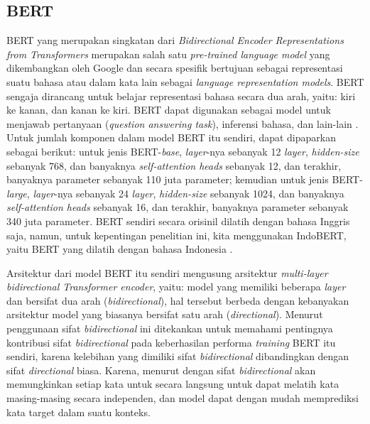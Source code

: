 \subsection{BERT}
\label{2.5.1}

BERT yang merupakan singkatan dari \emph{Bidirectional Encoder Representations from Transformers} merupakan salah satu \emph{pre-trained language model} yang dikembangkan oleh Google dan secara spesifik bertujuan sebagai representasi suatu bahasa atau dalam kata lain sebagai \emph{language representation models}. BERT sengaja dirancang untuk belajar representasi bahasa secara dua arah, yaitu: kiri ke kanan, dan kanan ke kiri. BERT dapat digunakan sebagai model untuk menjawab pertanyaan (\emph{question answering task}), inferensi bahasa, dan lain-lain \citep{devlin-etal-2019-bert}. Untuk jumlah komponen dalam model BERT itu sendiri, dapat dipaparkan sebagai berikut: untuk jenis BERT-\emph{base}, \emph{layer}-nya sebanyak 12 \emph{layer}, \emph{hidden-size} sebanyak 768, dan banyaknya \emph{self-attention heads} sebanyak 12, dan terakhir, banyaknya parameter sebanyak 110 juta parameter; kemudian untuk jenis BERT-\emph{large}, \emph{layer}-nya sebanyak 24 \emph{layer}, \emph{hidden-size} sebanyak 1024, dan banyaknya \emph{self-attention heads} sebanyak 16, dan terakhir, banyaknya parameter sebanyak 340 juta parameter. BERT sendiri secara orisinil dilatih dengan bahasa Inggris saja, namun, untuk kepentingan penelitian ini, kita menggunakan IndoBERT, yaitu BERT yang dilatih dengan bahasa Indonesia \citep{koto2020indolem}.

Arsitektur dari model BERT itu sendiri mengusung arsitektur \emph{multi-layer bidirectional Transformer encoder}, yaitu: model yang memiliki beberapa \emph{layer} dan bersifat dua arah (\emph{bidirectional}), hal tersebut berbeda dengan kebanyakan arsitektur model yang biasanya bersifat satu arah (\emph{directional}). Menurut 
\citet{devlin-etal-2019-bert} penggunaan sifat \emph{bidirectional} ini ditekankan untuk memahami pentingnya kontribusi sifat \emph{bidirectional} pada keberhasilan performa \emph{training} BERT itu sendiri, karena kelebihan yang dimiliki sifat \emph{bidirectional} dibandingkan dengan sifat \emph{directional} biasa. Karena, menurut \citet{devlin-etal-2019-bert} dengan sifat \emph{bidirectional} akan memungkinkan setiap kata untuk secara langsung untuk dapat melatih kata masing-masing secara independen, dan model dapat dengan mudah memprediksi kata target dalam suatu konteks.

